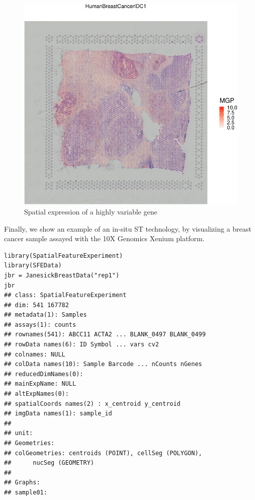 \documentclass[graybox]{svmult}
\begin{document}
\begin{figure}
\includegraphics[width=1\linewidth,]{spatpdfs/plotvisium-1} \caption{Spatial expression of a highly variable gene}\label{fig:plotvisium}
\end{figure}

Finally, we show an example of an in-situ ST technology, by visualizing a breast
cancer sample assayed with the 10X Genomics Xenium platform.

\begin{shaded}
\begin{verbatim}
library(SpatialFeatureExperiment)
library(SFEData)
jbr = JanesickBreastData("rep1")
jbr
## class: SpatialFeatureExperiment
## dim: 541 167782
## metadata(1): Samples
## assays(1): counts
## rownames(541): ABCC11 ACTA2 ... BLANK_0497 BLANK_0499
## rowData names(6): ID Symbol ... vars cv2
## colnames: NULL
## colData names(10): Sample Barcode ... nCounts nGenes
## reducedDimNames(0):
## mainExpName: NULL
## altExpNames(0):
## spatialCoords names(2) : x_centroid y_centroid
## imgData names(1): sample_id
##
## unit:
## Geometries:
## colGeometries: centroids (POINT), cellSeg (POLYGON), 
##      nucSeg (GEOMETRY)
##
## Graphs:
## sample01:
\end{verbatim}
\end{shaded}
\end{document}
